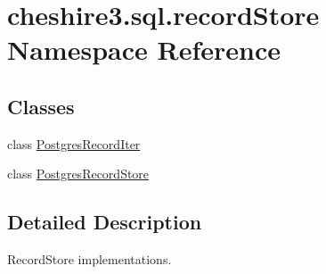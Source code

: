 \hypertarget{namespacecheshire3_1_1sql_1_1record_store}{\section{cheshire3.\-sql.\-record\-Store Namespace Reference}
\label{namespacecheshire3_1_1sql_1_1record_store}
}
\subsection*{Classes}
\begin{DoxyCompactItemize}
\item 
class \hyperlink{classcheshire3_1_1sql_1_1record_store_1_1_postgres_record_iter}{Postgres\-Record\-Iter}
\item 
class \hyperlink{classcheshire3_1_1sql_1_1record_store_1_1_postgres_record_store}{Postgres\-Record\-Store}
\end{DoxyCompactItemize}


\subsection{Detailed Description}
\begin{DoxyVerb}RecordStore implementations.\end{DoxyVerb}
 
